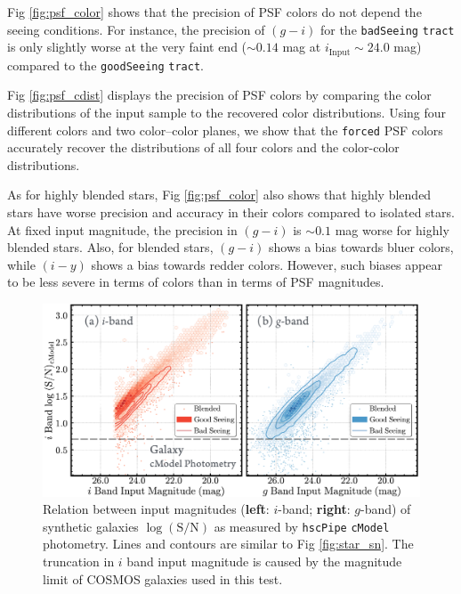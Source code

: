\documentclass[useamsfonts]{pasj01}
\def\hscpipe{\texttt{hscPipe}}
\def\cmodel{\texttt{cModel}}
\def\forced{\texttt{forced}}
\def\tract{\texttt{tract}}
\begin{document}
    Fig \ref{fig:psf_color} shows that the precision of PSF colors do not depend 
    the seeing conditions. 
    For instance, the precision of $(g-i)$ for the \texttt{badSeeing} \tract{} is 
    only slightly worse at the very faint end (${\sim}0.14$ mag at
    $i_{\mathrm{Input}}{\sim}24.0$ mag) compared to the \texttt{goodSeeing} \tract{}.

    Fig \ref{fig:psf_cdist} displays the precision of PSF colors by comparing the 
    color distributions of the input sample to the recovered color distributions. 
    Using four different colors and two color--color planes, we show that the 
    \forced{} PSF colors accurately recover the distributions of all four colors 
    and the color-color distributions.

    As for highly blended stars, Fig \ref{fig:psf_color} also shows that highly blended 
    stars have worse precision and accuracy in their colors compared to isolated stars. 
    At fixed input magnitude, the precision in $(g-i)$ is ${\sim}0.1$ mag worse for 
    highly blended stars.  
    Also, for blended stars, $(g-i)$ shows a bias towards bluer colors, while $(i-y)$ 
    shows a bias towards redder colors. 
    However, such biases appear to be less severe in terms of colors than in terms of
    PSF magnitudes.
    

\begin{figure}
    \begin{center}
        \includegraphics[width=\textwidth]{fig/synpipe_galaxy_sn}
    \end{center}
    \caption{
        Relation between input magnitudes (\textbf{left}: $i$-band; \textbf{right}:
        $g$-band) of synthetic galaxies $\log (\mathrm{S}/\mathrm{N})$ as measured 
        by \hscpipe{} \cmodel{} photometry. 
        Lines and contours are similar to Fig \ref{fig:star_sn}.
        The truncation in $i$ band input magnitude is caused by the magnitude limit 
        of COSMOS galaxies used in this test. 
        }
    \label{fig:cmodel_sn}
\end{figure}
\end{document}
